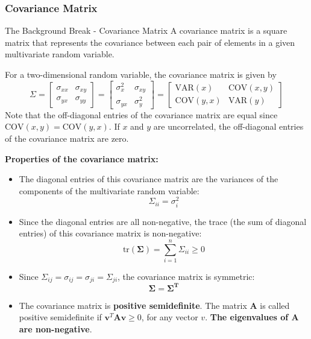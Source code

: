 \subsubsection{Covariance Matrix}
\begin{frame}{The Background Break - Covariance Matrix}
A covariance matrix is a square matrix that represents the covariance between each
pair of elements in a given multivariate random variable.

For a two-dimensional random variable, the covariance matrix is given by
\begin{equation*}
    \Sigma = 
    \begin{bmatrix}
        \sigma_{xx} & \sigma_{xy} \\
        \sigma_{yx} & \sigma_{yy}
    \end{bmatrix}
    =
    \begin{bmatrix}
        \sigma^2_{x} & \sigma_{xy} \\
        \sigma_{yx} & \sigma^2_{y}
    \end{bmatrix}
    =
    \begin{bmatrix}
        \text{VAR}(x) & \text{COV}(x, y) \\
        \text{COV}(y, x) & \text{VAR}(y)
    \end{bmatrix}
\end{equation*}
Note that the off-diagonal entries of the covariance matrix are equal since $\text{COV}(x, y) =
\text{COV}(y, x)$. If $x$ and $y$ are uncorrelated, the off-diagonal entries of the covariance
matrix are zero.


\textbf{Properties of the covariance matrix:}
\begin{itemize}
    \item The diagonal entries of this covariance matrix are the variances of the components of the multivariate random variable:
    $$\Sigma_{ii} = \sigma^2_{i}$$
    \item Since the diagonal entries are all non-negative, the trace (the sum of diagonal entries) of this covariance matrix is non-negative:
    $$\text{tr}(\mathbf{\Sigma}) = \sum_{i=1}^{n} \Sigma_{ii} \geq 0$$ 
    \item Since \(\Sigma_{ij} = \sigma_{ij} = \sigma_{ji} = \Sigma_{ji}\), the covariance matrix is symmetric:
    $$\mathbf{\Sigma} = \mathbf{\Sigma^T}$$
    \item The covariance matrix is \textbf{positive semidefinite}. The matrix \(\mathbf{A}\) is called positive semidefinite if \(\mathbf{v}^T \mathbf{A} \mathbf{v} \geq 0\), for any vector \(v\). \textbf{The eigenvalues of \(\mathbf{A}\) are non-negative}.
\end{itemize}

\end{frame}
